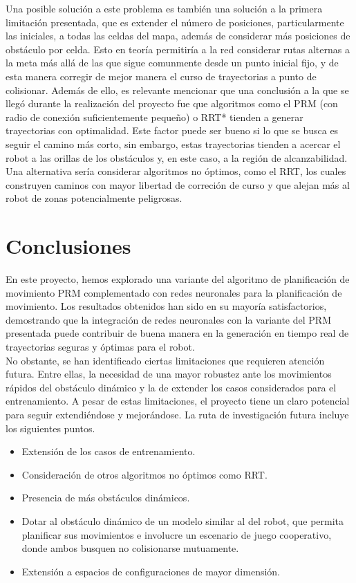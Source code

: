 \documentclass[spanish,mexico]{article}
\numberwithin{equation}{section}
\theoremstyle{definition}
\theoremstyle{remark}
\begin{document}
Una posible solución a este problema es también una solución a la primera limitación presentada, que es extender el número de posiciones, particularmente las iniciales, a todas las celdas del mapa, además de considerar más posiciones de obstáculo por celda. Esto en teoría permitiría a la red considerar rutas alternas a la meta más allá de las que sigue comunmente desde un punto inicial fijo, y de esta manera corregir de mejor manera el curso de trayectorias a punto de colisionar. Además de ello, es relevante mencionar que una conclusión a la que se llegó durante la realización del proyecto \cite{Verano} fue que algoritmos como el PRM (con radio de conexión suficientemente pequeño) o RRT* tienden a generar trayectorias con optimalidad. Este factor puede ser bueno si lo que se busca es seguir el camino más corto, sin embargo, estas trayectorias tienden a acercar el robot a las orillas de los obstáculos y, en este caso, a la región de alcanzabilidad. Una alternativa sería considerar algoritmos no óptimos, como el RRT, los cuales construyen caminos con mayor libertad de correción de curso y que alejan más al robot de zonas potencialmente peligrosas.   

\section{Conclusiones}
En este proyecto, hemos explorado una variante del algoritmo de planificación de movimiento PRM complementado con redes neuronales para la planificación de movimiento. Los resultados obtenidos han sido en su mayoría satisfactorios, demostrando que la integración de redes neuronales con la variante del PRM presentada puede contribuir de buena manera en la generación en tiempo real de trayectorias seguras y óptimas para el robot.\\

No obstante, se han identificado ciertas limitaciones que requieren atención futura. Entre ellas, la necesidad de una mayor robustez ante los movimientos rápidos del obstáculo dinámico y la de extender los casos considerados para el entrenamiento. A pesar de estas limitaciones, el proyecto tiene un claro potencial para seguir extendiéndose y mejorándose. La ruta de investigación futura incluye los siguientes puntos.

\begin{itemize}
\item Extensión de los casos de entrenamiento.
\item Consideración de otros algoritmos no óptimos como RRT.
\item Presencia de más obstáculos dinámicos.
\item Dotar al obstáculo dinámico de un modelo similar al del robot, que permita planificar sus movimientos e involucre un escenario de juego cooperativo, donde ambos busquen no colisionarse mutuamente. 
\item Extensión a espacios de configuraciones de mayor dimensión.
\end{itemize}
\end{document}
